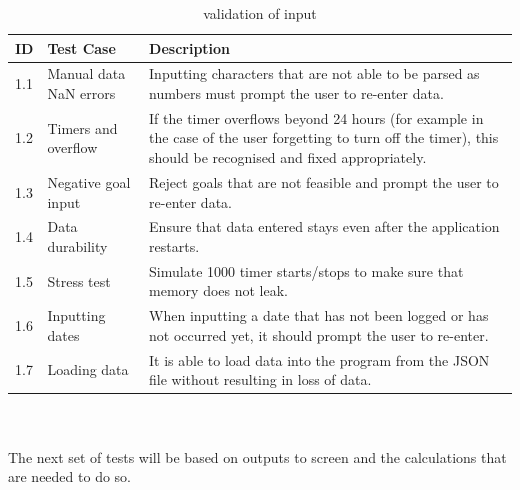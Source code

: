 \documentclass[12pt,a4paper]{article}
\begin{document}
\begin{table}[H]
    \centering
    \renewcommand{\arraystretch}{1.3}
    \begin{tabular}{|l|l|p{9cm}|}
        \hline
        \textbf{ID} & \textbf{Test Case} & \textbf{Description} \\
        \hline
        1.1 & Manual data NaN errors  & Inputting characters that are not able to be parsed as numbers must prompt the user to re-enter data.\\
        \hline
        1.2 & Timers and overflow & If the timer overflows beyond 24 hours (for example in the case of the user forgetting to turn off the timer), this should be recognised and fixed appropriately.\\
        \hline
        1.3 & Negative goal input & Reject goals that are not feasible and prompt the user to re-enter data.\\
        \hline
        1.4 & Data durability & Ensure that data entered stays even after the application restarts.\\
        \hline
        1.5 & Stress test & Simulate 1000 timer starts/stops to make sure that memory does not leak.\\
        \hline
        1.6 & Inputting dates & When inputting a date that has not been logged or has not occurred yet, it should prompt the user to re-enter.\\
        \hline
        1.7 & Loading data & It is able to load data into the program from the JSON file without resulting in loss of data.\\
        \hline
    \end{tabular}
    \caption{validation of input}
    \label{tab:input_tests}
\end{table}
\\
\\
The next set of tests will be based on outputs to screen and the calculations that are needed to do so.
\\
\\
\end{document}
